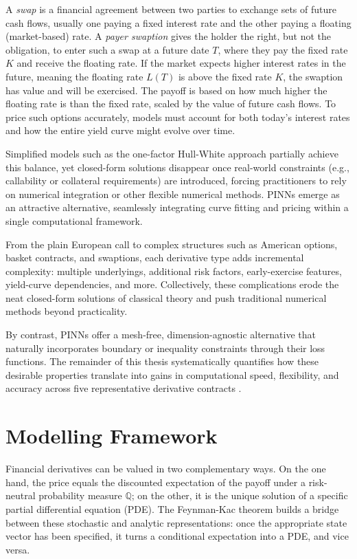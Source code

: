\documentclass[12pt]{report} %
\theoremstyle{plain} %
\theoremstyle{definition} %
\theoremstyle{remark} %
\begin{document}
A \emph{swap} is a financial agreement between two parties to exchange sets of future 
cash flows, usually one paying a fixed interest rate and the other paying a floating 
(market-based) rate. A \emph{payer swaption} gives the holder the right, but not the obligation, 
to enter such a swap at a future date \(T\), where they pay the fixed rate \(K\) and receive 
the floating rate. If the market expects higher interest rates in the future, meaning the floating 
rate \(L(T)\) is above the fixed rate \(K\), the swaption has value and will be exercised. The 
payoff is based on how much higher the floating rate is than the fixed rate, scaled by the value 
of future cash flows. To price such options accurately, models must account for both today's 
interest rates and how the entire yield curve might evolve over time.

Simplified models such as the one-factor Hull-White approach partially achieve this balance, yet
closed-form solutions disappear once real-world constraints (e.g., callability or collateral
requirements) are introduced, forcing practitioners to rely on numerical integration or other
flexible numerical methods. PINNs emerge as an attractive alternative, seamlessly integrating curve
fitting and pricing within a single computational framework.

From the plain European call to complex structures such as American options, basket contracts, and
swaptions, each derivative type adds incremental complexity: multiple underlyings, additional risk
factors, early-exercise features, yield-curve dependencies, and more. Collectively, these
complications erode the neat closed-form solutions of classical theory and push traditional
numerical methods beyond practicality.

By contrast, PINNs offer a mesh-free, dimension-agnostic alternative that naturally incorporates
boundary or inequality constraints through their loss functions. The remainder of this thesis
systematically quantifies how these desirable properties translate into gains in computational
speed, flexibility, and accuracy across five representative derivative contracts
\cite{huge2020differentialmachinelearning,heaton2018deeplearningfinance}.

\section{Modelling Framework}\label{sec:modelling_framework}

Financial derivatives can be valued in two complementary ways. 
On the one hand, the price equals the discounted expectation of the payoff
under a risk-neutral probability measure $\mathbb Q$; on the other, it is the
unique solution of a specific partial differential equation (PDE). 
The Feynman-Kac theorem builds a bridge between these stochastic and analytic
representations: once the appropriate state vector has been specified, it
turns a conditional expectation into a PDE, and vice versa.
\end{document}
